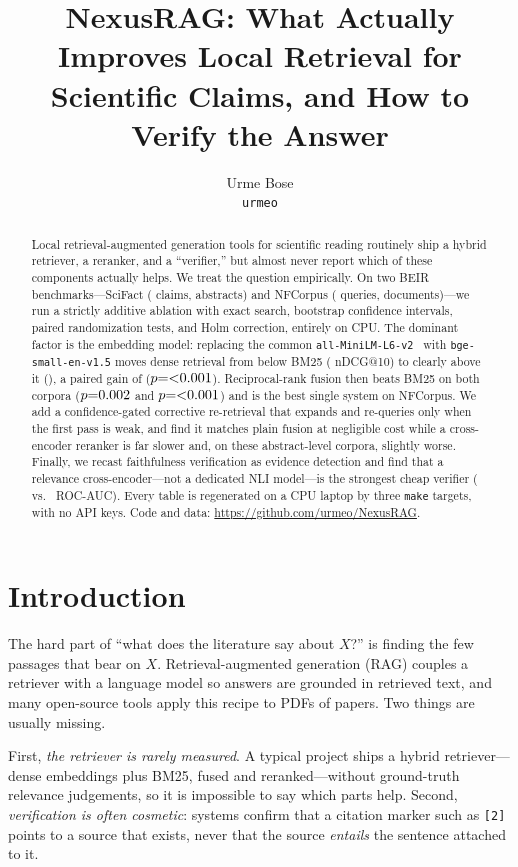 \documentclass[11pt]{article}
\title{\textbf{NexusRAG: What Actually Improves Local Retrieval for\\
Scientific Claims, and How to Verify the Answer}}
\author{Urme Bose\\\texttt{urmeo}}
\date{}
\begin{document}
\maketitle

\begin{abstract}
Local retrieval-augmented generation tools for scientific reading routinely ship
a hybrid retriever, a reranker, and a ``verifier,'' but almost never report which
of these components actually helps. We treat the question empirically. On two
BEIR benchmarks---SciFact (\NumQueries{} claims, \CorpusSize{} abstracts) and
NFCorpus (\NFqueries{} queries, \NFcorpus{} documents)---we run a strictly
additive ablation with exact search, bootstrap confidence intervals, paired
randomization tests, and Holm correction, entirely on CPU. The dominant factor
is the embedding model: replacing the common \texttt{all-MiniLM-L6-v2}~\citep{wang2020minilm} with
\texttt{bge-small-en-v1.5} moves dense retrieval from below BM25 (\SciDenseMini{}
nDCG@10) to clearly above it (\SciDense{}), a paired gain of \SciEmbGain{}
($p{=}\SciEmbP{}$). Reciprocal-rank fusion then beats BM25 on both corpora
($p{=}0.002{}$ and $p{=}\NFhybridP{}$) and is the best single system on
NFCorpus. We add a confidence-gated corrective re-retrieval that expands and
re-queries only when the first pass is weak, and find it matches plain fusion at
negligible cost while a cross-encoder reranker is far slower and, on these
abstract-level corpora, slightly worse.
Finally, we recast faithfulness verification as evidence detection and find that
a relevance cross-encoder---not a dedicated NLI model---is the strongest cheap
verifier (\FaithCeAuroc{} vs.\ \FaithNliAuroc{} ROC-AUC). Every table is
regenerated on a CPU laptop by three \texttt{make} targets, with no API keys.
Code and data: \url{https://github.com/urmeo/NexusRAG}.
\end{abstract}

\section{Introduction}

The hard part of ``what does the literature say about $X$?'' is finding the few
passages that bear on $X$. Retrieval-augmented generation (RAG)
\citep{lewis2020rag} couples a retriever with a language model so answers are
grounded in retrieved text, and many open-source tools apply this recipe to PDFs
of papers. Two things are usually missing.

First, \emph{the retriever is rarely measured}. A typical project ships a hybrid
retriever---dense embeddings plus BM25, fused and reranked---without ground-truth
relevance judgements, so it is impossible to say which parts help. Second,
\emph{verification is often cosmetic}: systems confirm that a citation marker
such as \texttt{[2]} points to a source that exists, never that the source
\emph{entails} the sentence attached to it.
\end{document}
